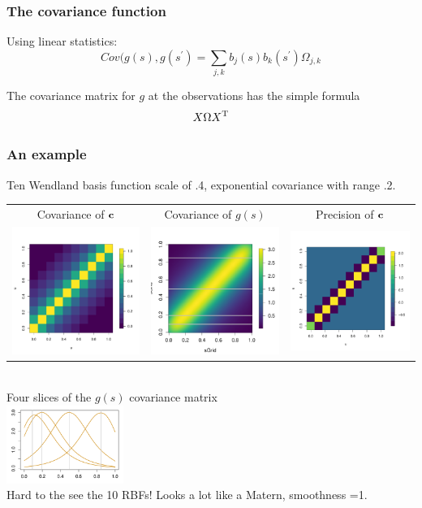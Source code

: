 \documentclass[english]{beamer} %
\def\Myspace{{\vspace*{.125in}}}
\begin{document}
\begin{frame} %
\frametitle{The covariance function}

Using linear statistics: 
\[ Cov( g(s), g(s^{\prime} ) =  \sum_{j,k}  b_j(s) b_k(s^{\prime}) \Omega_{j,k} \]

The covariance matrix for $g$ at the observations has the simple  formula  \\
\[ X \Omega X^{\rm T} \]

\end{frame} %

\begin{frame} %
\frametitle{An example}
Ten  Wendland basis function  scale of .4, exponential covariance with range .2. \\
\Myspace
\Myspace
\begin{tabular}{ccc}
Covariance of $\mathbf{c}$ & Covariance of $g(s)$ & Precision of $\mathbf{c}$ \\
 \includegraphics[height=.75in]{pix/FRKCovCoef.pdf} & \includegraphics[height=.75in]{pix/FRKCovImage.pdf} &
 \includegraphics[height=.75in]{pix/FRKPrecisionCoef.pdf} 
 \end{tabular}\\
Four slices of  the  $g(s)$ covariance matrix \\
\includegraphics[height=1in]{pix/FRKCov.pdf}
 \\
Hard to the see the 10 RBFs!  Looks a lot like a Matern,  smoothness =1. 
 
\end{frame} %
\end{document}
